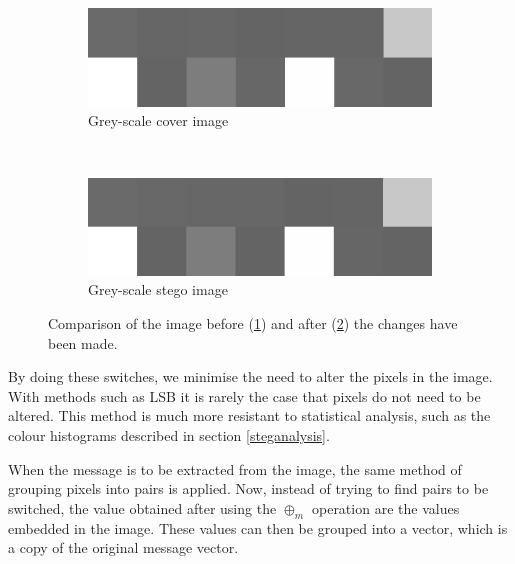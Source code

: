 \begin{figure}[h!]
    \centering
    \begin{subfigure}[b]{0.45\textwidth}
        \includegraphics[width=\textwidth, frame]{figures/pixelgrid.png}
		\caption{Grey-scale cover image}
		\label{fig:startingImageComp}
    \end{subfigure}
    ~ %
    \begin{subfigure}[b]{0.45\textwidth}
        \includegraphics[width=\textwidth, frame]{figures/pixelgrid2.png}
		\caption{Grey-scale stego image}
		\label{fig:endingImageComp}
    \end{subfigure}
    \caption{Comparison of the image before (\ref{fig:startingImageComp}) and after (\ref{fig:endingImageComp}) the changes have been made.}\label{fig:pixelGrids}
\end{figure}

By doing these switches, we minimise the need to alter the pixels in the image.
With methods such as LSB it is rarely the case that pixels do not need to be altered.
This method is much more resistant to statistical analysis, such as the colour histograms described in section \ref{steganalysis}.

When the message is to be extracted from the image, the same method of grouping pixels into pairs is applied.
Now, instead of trying to find pairs to be switched, the value obtained after using the $\oplus_m$ operation are the values embedded in the image.
These values can then be grouped into a vector, which is a copy of the original message vector.